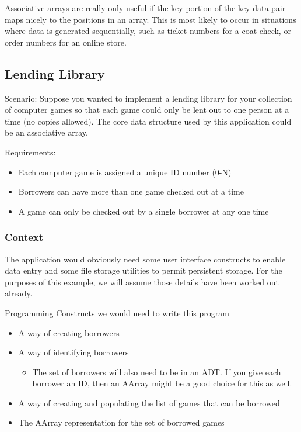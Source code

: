 Associative arrays are really only useful if the  key portion of the key-data pair maps nicely to the positions in an array.   This is most likely to occur in situations where data is generated sequentially,  such as ticket numbers for a coat check,  or order numbers for an online store.

\subsection{Lending Library}

Scenario: Suppose you wanted to implement a lending library for your collection of computer games so that each game could only be lent out to one person at a time (no copies allowed). The core data structure used by this application could be an associative array.


Requirements: 
\begin{itemize}
	\item Each computer game is assigned a unique ID number (0-N)
	\item Borrowers can have more than one game checked out at a time
	\item A game can only be checked out by a single borrower at any one time
\end{itemize}

\subsubsection{Context}

The application would obviously need some user interface constructs to enable data entry and some file storage utilities to permit persistent storage. For the purposes of this example, we will assume those details have been worked out already.


Programming Constructs we would need to write this program
\begin{itemize}
	\item A way of creating borrowers
	\item A way of identifying borrowers 
\begin{itemize}
	\item The set of borrowers will also need to be in an ADT. If you give each borrower an ID, then an AArray might be a good choice for this as well.
\end{itemize}
	\item A way of creating and populating the list of games that can be borrowed
	\item The AArray representation for the set of borrowed games
\end{itemize}


